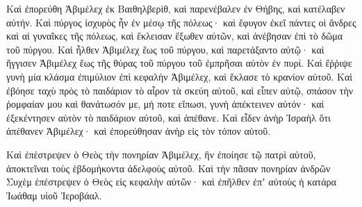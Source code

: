 {\par }{\PP {}Καὶ ἐπορεύθη Ἀβιμέλεχ ἐκ Βαιθηλβερὶθ, καὶ παρενέβαλεν ἐν Θήβης, καὶ κατέλαβεν αὐτήν.
Καὶ πύργος ἰσχυρὸς ἦν ἐν μέσῳ τῆς πόλεως· καὶ ἔφυγον ἐκεῖ πάντες οἱ ἄνδρες καὶ αἱ γυναῖκες τῆς πόλεως, καὶ ἔκλεισαν ἔξωθεν αὐτῶν, καὶ ἀνέβησαν ἐπὶ τὸ δῶμα τοῦ πύργου.
Καὶ ἦλθεν Ἀβιμέλεχ ἕως τοῦ πύργου, καὶ παρετάξαντο αὐτῷ· καὶ ἤγγισεν Ἀβιμέλεχ ἕως τῆς θύρας τοῦ πύργου τοῦ ἐμπρῆσαι αὐτὸν ἐν πυρί.
Καὶ ἔῤῥιψε γυνὴ μία κλάσμα ἐπιμύλιον ἐπὶ κεφαλὴν Ἀβιμέλεχ, καὶ ἔκλασε τὸ κρανίον αὐτοῦ.
Καὶ ἐβόησε ταχὺ πρὸς τὸ παιδάριον τὸ αἶρον τὰ σκεύη αὐτοῦ, καὶ εἶπεν αὐτῷ, σπάσον τὴν ῥομφαίαν μου καὶ θανάτωσόν με, μή ποτε εἴπωσι, γυνὴ ἀπέκτεινεν αὐτόν· καὶ ἐξεκέντησεν αὐτὸν τὸ παιδάριον αὐτοῦ, καὶ ἀπέθανε.
Καὶ εἶδεν ἀνὴρ Ἰσραὴλ ὅτι ἀπέθανεν Ἀβιμέλεχ· καὶ ἐπορεύθησαν ἀνὴρ εἰς τὸν τόπον αὐτοῦ.
\par }{\PP {}Καὶ ἐπέστρεψεν ὁ Θεὸς τὴν πονηρίαν Ἀβιμέλεχ, ἣν ἐποίησε τῷ πατρὶ αὐτοῦ, ἀποκτεῖναι τοὺς ἑβδομήκοντα ἀδελφοὺς αὐτοῦ.
Καὶ τὴν πᾶσαν πονηρίαν ἀνδρῶν Συχὲμ ἐπέστρεψεν ὁ Θεὸς εἰς κεφαλὴν αὐτῶν· καὶ ἐπῆλθεν ἐπʼ αὐτοὺς ἡ κατάρα Ἰωάθαμ υἱοῦ Ἰεροβάαλ.

}

